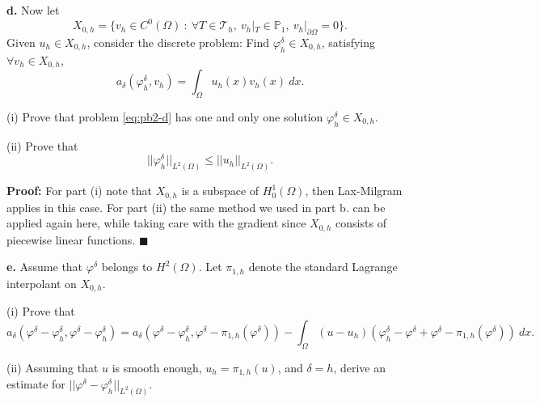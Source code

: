 \documentclass[11pt]{article}
\begin{document}
\textbf{d.} Now let 
\begin{equation}
    X_{0,h} = \{ v_h \in C^0(\Omega) \: : \: \forall T \in \mathcal{T}_h, \: v_h|_T \in \mathbb{P}_1, \: v_h|_{\partial \Omega} = 0 \}.
\end{equation}
Given $u_h \in X_{0,h}$, consider the discrete problem: Find $\varphi^\delta_h \in X_{0,h}$, satisfying $\forall v_h \in X_{0,h}$,
\begin{equation} \label{eq:pb2-d}
    a_\delta(\varphi^\delta_h, v_h) = \int_\Omega u_h(x) v_h(x) \: dx.
\end{equation}

\hspace{1cm} (i) Prove that problem \eqref{eq:pb2-d} has one and only one solution $\varphi^\delta_h \in X_{0,h}$.
    
\hspace{1cm} (ii) Prove that 
\begin{equation}
    ||\varphi^\delta_h||_{L^2(\Omega)} \leq ||u_h||_{L^2(\Omega)}.
\end{equation}



\vskip 1cm


\textbf{Proof:} For part (i) note that $X_{0,h}$ is a subspace of $H^1_0(\Omega)$, then Lax-Milgram applies in this case.
For part (ii) the same method we used in part b. can be applied again here, while taking care with the gradient since $X_{0,h}$ consists of piecewise linear functions. $\blacksquare$


\vskip 2cm



\textbf{e.} Assume that $\varphi^\delta$ belongs to $H^2(\Omega)$. 
Let $\pi_{1,h}$ denote the standard Lagrange interpolant on $X_{0,h}$.

\hspace{1cm} (i) Prove that
\begin{equation*}
    a_\delta(\varphi^\delta - \varphi^\delta_h, \varphi^\delta - \varphi^\delta_h) = a_\delta(\varphi^\delta - \varphi^\delta_h, \varphi^\delta - \pi_{1,h}(\varphi^\delta)) - \int_\Omega (u - u_h)(\varphi^\delta_h - \varphi^\delta + \varphi^\delta - \pi_{1,h}(\varphi^\delta)) \: dx.
\end{equation*}

\hspace{1cm} (ii) Assuming that $u$ is smooth enough, $u_h = \pi_{1,h}(u)$, and $\delta = h$, derive an estimate for  $||\varphi^\delta - \varphi^\delta_h||_{L^2(\Omega)}$. 
\end{document}
